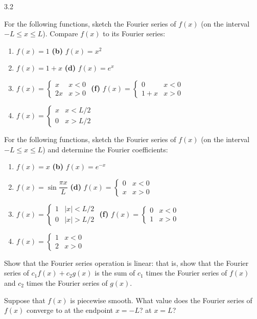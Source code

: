 \begin{exercises}{3.2}
\item For the following functions, sketch the Fourier series of $f(x)$ (on the interval $-L \le x \le L$).  Compare $f(x)$ to its Fourier series:
\begin{enumerate}
\item[\textbf{(a)}] $f(x) = 1$ \hfill \starred\textbf{(b)} $f(x) = x^2$
\item[\textbf{(c)}] $f(x) = 1 + x$ \hfill \starred\textbf{(d)} $f(x) = e^x$
\item[\textbf{(e)}] $f(x) = \begin{cases} x & x < 0 \\ 2x & x > 0 \end{cases}$ \hfill \starred\textbf{(f)} $f(x) = \begin{cases} 0 & x < 0 \\ 1+x & x > 0 \end{cases}$
\item[\textbf{(g)}] $f(x) = \begin{cases} x & x < L/2 \\ 0 & x > L/2 \end{cases}$
\end{enumerate}

\item For the following functions, sketch the Fourier series of $f(x)$ (on the interval $-L \le x \le L$) and determine the Fourier coefficients:
\begin{enumerate}
\item[\starred\textbf{(a)}] $f(x) = x$ \hfill \textbf{(b)} $f(x) = e^{-x}$
\item[\starred\textbf{(c)}] $f(x) = \sin \dfrac{\pi x}{L}$ \hfill \textbf{(d)} $f(x) = \begin{cases} 0 & x < 0 \\ x & x > 0 \end{cases}$
\item[\textbf{(e)}] $f(x) = \begin{cases} 1 & |x| < L/2 \\ 0 & |x| > L/2 \end{cases}$ \hfill \starred\textbf{(f)} $f(x) = \begin{cases} 0 & x < 0 \\ 1 & x > 0 \end{cases}$
\item[\textbf{(g)}] $f(x) = \begin{cases} 1 & x < 0 \\ 2 & x > 0 \end{cases}$
\end{enumerate}

\item Show that the Fourier series operation is linear: that is, show that the Fourier series of $c_1 f(x) + c_2 g(x)$ is the sum of $c_1$ times the Fourier series of $f(x)$ and $c_2$ times the Fourier series of $g(x)$.

\item Suppose that $f(x)$ is piecewise smooth.  What value does the Fourier series of $f(x)$ converge to at the endpoint $x = -L$? at $x = L$?
\end{exercises}
